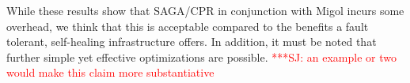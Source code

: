 \documentclass[times, 10pt,twocolumn]{article}
\newcommand{\jhanote}[1]{ {\textcolor{red} { ***SJ: #1 }}}
\newcommand{\jhanote}[1]{}
\begin{document}
While these results show that SAGA/CPR in conjunction with Migol
incurs some overhead, we think that this is acceptable compared to the
benefits a fault tolerant, self-healing infrastructure offers. In
addition, it must be noted that further simple yet effective
optimizations are possible. \jhanote{an example or two would make this
  claim more substantiative}


%     
%     
\end{document}
